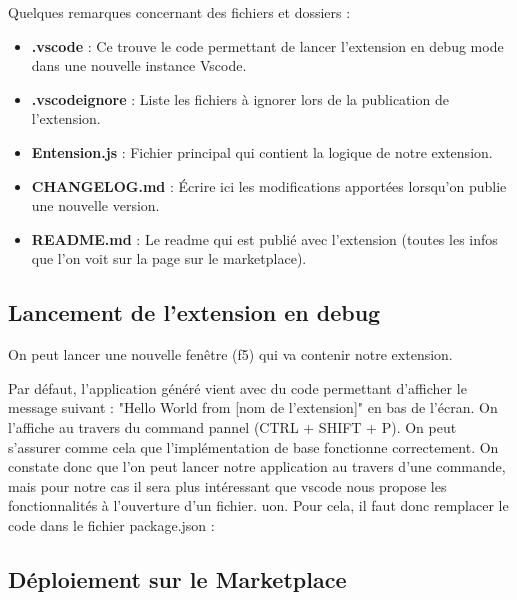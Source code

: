 \documentclass[
    iict, %
    il, %
]{heig-tb}
\begin{document}
Quelques remarques concernant des fichiers et dossiers :
\begin{itemize}
    \item \textbf{.vscode} : Ce trouve le code permettant de lancer l'extension en debug mode dans une nouvelle instance Vscode.
    \item \textbf{.vscodeignore} : Liste les fichiers à ignorer lors de la publication de l'extension.
    \item \textbf{Entension.js} : Fichier principal qui contient la logique de notre extension.
    \item \textbf{CHANGELOG.md} : Écrire ici les modifications apportées lorsqu'on publie une nouvelle version.
    \item \textbf{README.md} : Le readme qui est publié avec l'extension (toutes les infos que l'on voit sur la page sur le marketplace).
\end{itemize}

\subsection{Lancement de l'extension en debug}
On peut lancer une nouvelle fenêtre (f5) qui va contenir notre extension.

Par défaut, l'application généré vient avec du code permettant d'afficher le message suivant : "Hello World from [nom de l'extension]" en bas de l'écran. On l'affiche au travers du command pannel (CTRL + SHIFT + P). On peut s'assurer comme cela que l'implémentation de base fonctionne correctement.
On constate donc que l'on peut lancer notre application au travers d'une commande, mais pour notre cas il sera plus intéressant que vscode nous propose les fonctionnalités à l'ouverture d'un fichier. uon.
Pour cela, il faut donc remplacer le code dans le fichier package.json :

\subsection{Déploiement sur le Marketplace}
\end{document}
